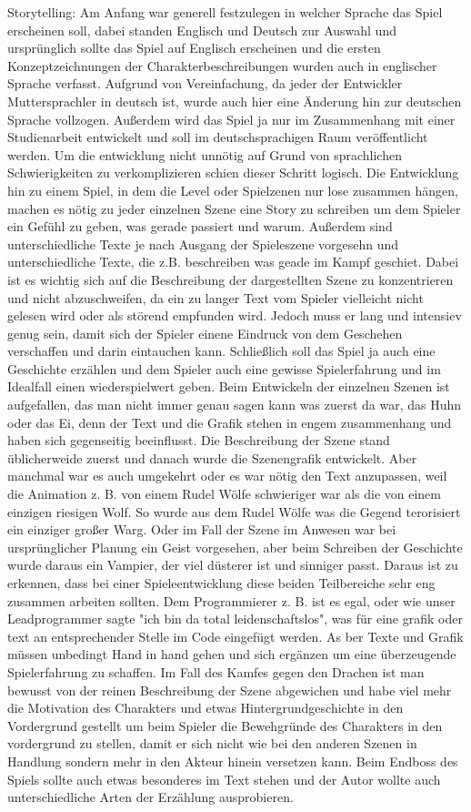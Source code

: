 Storytelling: Am Anfang war generell festzulegen in welcher Sprache das Spiel erscheinen soll, dabei standen Englisch und Deutsch zur Auswahl und ursprünglich sollte das Spiel auf Englisch erscheinen und die ersten Konzeptzeichnungen der Charakterbeschreibungen wurden auch in englischer Sprache verfasst. Aufgrund von Vereinfachung, da jeder der Entwickler Muttersprachler in deutsch ist, wurde auch hier eine Änderung hin zur deutschen Sprache vollzogen. Außerdem wird das Spiel ja nur im Zusammenhang mit einer Studienarbeit entwickelt und soll im deutschsprachigen Raum veröffentlicht werden. Um die entwicklung nicht unnötig auf Grund von sprachlichen Schwierigkeiten zu verkomplizieren schien dieser Schritt logisch. Die Entwicklung hin zu einem Spiel, in dem die Level oder Spielzenen nur lose zusammen hängen, machen es nötig zu jeder einzelnen Szene eine Story zu schreiben um dem Spieler ein Gefühl zu geben, was gerade passiert und warum. Außerdem sind unterschiedliche Texte je nach Ausgang der Spieleszene vorgesehn und unterschiedliche Texte, die z.B. beschreiben was geade im Kampf geschiet.
Dabei ist es wichtig sich auf die Beschreibung der dargestellten Szene zu konzentrieren und nicht abzuschweifen, da ein zu langer Text vom Spieler vielleicht nicht gelesen wird oder als störend empfunden wird. Jedoch muss er lang und intensiev genug sein, damit sich der Spieler einene Eindruck von dem Geschehen verschaffen und darin eintauchen kann. Schließlich soll das Spiel ja auch eine Geschichte erzählen und dem Spieler auch eine gewisse Spielerfahrung und im Idealfall einen wiederspielwert geben. Beim Entwickeln der einzelnen Szenen ist aufgefallen, das man nicht immer genau sagen kann was zuerst da war, das Huhn oder das Ei, denn der Text und die Grafik stehen in engem zusammenhang und haben sich gegenseitig beeinflusst. Die Beschreibung der Szene stand üblicherweide zuerst und danach wurde die Szenengrafik entwickelt. Aber manchmal war es auch umgekehrt oder es war nötig den Text anzupassen, weil die Animation z. B. von einem Rudel Wölfe schwieriger war als die von einem einzigen riesigen Wolf. So wurde aus dem Rudel Wölfe was die Gegend terorisiert ein einziger großer Warg. Oder im Fall der Szene im Anwesen war bei ursprünglicher Planung ein Geist vorgesehen, aber beim Schreiben der Geschichte wurde daraus ein Vampier, der viel düsterer ist und sinniger passt. Daraus ist zu erkennen, dass bei einer Spieleentwicklung diese beiden Teilbereiche sehr eng zusammen arbeiten sollten. Dem Programmierer z. B. ist es egal, oder wie unser Leadprogrammer sagte "ich bin da total leidenschaftslos", was für eine grafik oder text an entsprechender Stelle im Code eingefügt werden. As ber Texte und Grafik müssen unbedingt Hand in hand gehen und sich ergänzen um eine überzeugende Spielerfahrung zu schaffen. Im Fall des Kamfes gegen den Drachen ist man bewusst von der reinen Beschreibung der Szene abgewichen und habe viel mehr die Motivation des Charakters und etwas Hintergrundgeschichte in den Vordergrund gestellt um beim Spieler die Bewehgründe des Charakters in den vordergrund zu stellen, damit er sich nicht wie bei den anderen Szenen in Handlung sondern mehr in den Akteur hinein versetzen kann. Beim Endboss des Spiels sollte auch etwas besonderes im Text stehen und der Autor wollte auch unterschiedliche Arten der Erzählung ausprobieren.